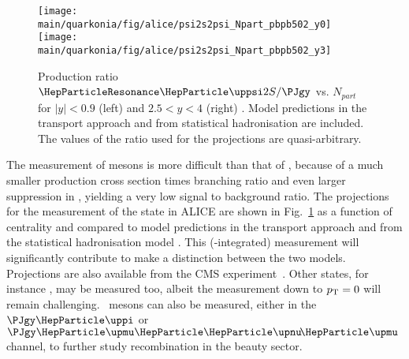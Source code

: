 \documentclass[../report.tex]{subfiles}
\providecommand{\main}{..}
\begin{document}


\begin{figure}[h]
\begin{center}
 \texttt{[image: \\main/quarkonia/fig/alice/psi2s2psi\_Npart\_pbpb502\_y0]}
 \texttt{[image: \\main/quarkonia/fig/alice/psi2s2psi\_Npart\_pbpb502\_y3]}
\end{center}
 \caption{Production ratio $\PGyP{2S}/\PJgy$ vs. $N_{part}$ for $|y|<0.9$ (left) and $2.5<y<4$ (right) \cite{Abelevetal:2014cna,CERN-LHCC-2013-014}. Model predictions in the transport approach \cite{Du:2015wha} and from statistical hadronisation \cite{Andronic:2017pug} are included. The values of the ratio used for the projections are quasi-arbitrary.}
\label{FigQ:psi2SPbPb}
\end{figure}

The measurement of  mesons is more difficult than that of \PJgy, because of a much smaller production cross section times branching ratio and even larger suppression in \PbPb, yielding a very low signal to background ratio.
The projections for the measurement of the  state in ALICE are shown in Fig.~\ref{FigQ:psi2SPbPb} as a function of centrality and compared to model predictions in the transport approach \cite{Du:2015wha}  and from the statistical hadronisation model \cite{Andronic:2017pug}. This (\pT-integrated) measurement will significantly contribute to make a distinction between the two models. Projections are also available from the CMS experiment~\cite{CMS-PAS-FTR-17-002}.
Other states, for instance \PGcc, may be measured too, albeit the measurement down to $p\sb{\scriptstyle\mathrm{T}}=0$ will remain challenging. \PBc\ mesons can also be measured, either in the $\PJgy\PGp$ or $\PJgy\PGm\PGnGm$ channel, to further study recombination in the beauty sector.
\end{document}
